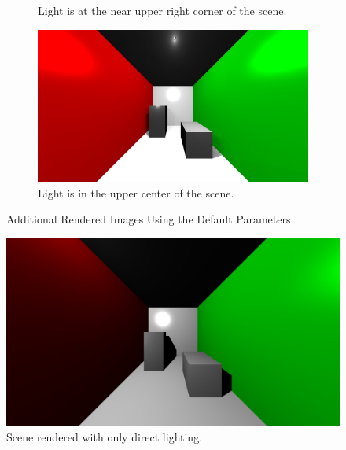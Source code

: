 \begin{figure}
\begin{subfigure}[b]{0.5\textwidth}
                \caption{Light is at the near upper right corner of the scene.}
                \label{fig:sample4}
        \end{subfigure}
        \begin{subfigure}[b]{0.5\textwidth}
                \includegraphics[width=\textwidth]{sample5.jpg}
                \caption{Light is in the upper center of the scene.}
                \label{fig:sample5}
        \end{subfigure}
        \caption{Additional Rendered Images Using the Default Parameters}\label{fig:default}
\end{figure}


\begin{figure}[h!]
  \centering
    \includegraphics[width=1.0\textwidth]{direct_only.jpg}
    \caption{Scene rendered with only direct lighting.}
	\label{fig:directonly}
\end{figure}


